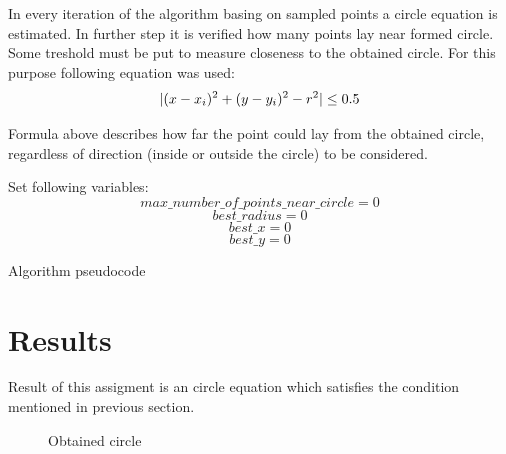 \documentclass[notitlepage,english]{hgbreport}
\DeclarePairedDelimiter{\abs}{\lvert}{\rvert}
\begin{document}
In every iteration of the algorithm basing on sampled points a circle equation is estimated. In further step it is verified how many points lay near formed circle. Some treshold must be put to measure closeness to the obtained circle. For this purpose following equation was used:
\[\abs{(x-x_{i})^2+(y-y_{i})^2-r^2}\le0.5\]			

Formula above  describes how far the point could lay from the obtained circle, regardless of direction (inside or outside the circle) to be considered.

\begin{algorithm}[H]
\SetAlgoLined
{}
 Set following variables:
\[max\_number\_of\_points\_near\_circle=0\] 
 \[best\_radius=0\] 
 \[best\_x=0\] 
 \[best\_y=0\] 
 \caption{Algorithm pseudocode}
\end{algorithm}

\section {Results}

Result of this assigment is an circle equation which satisfies the condition mentioned in previous section.

\begin{figure}[!htbp]
\caption{Obtained circle}
\end{figure}
\end{document}
